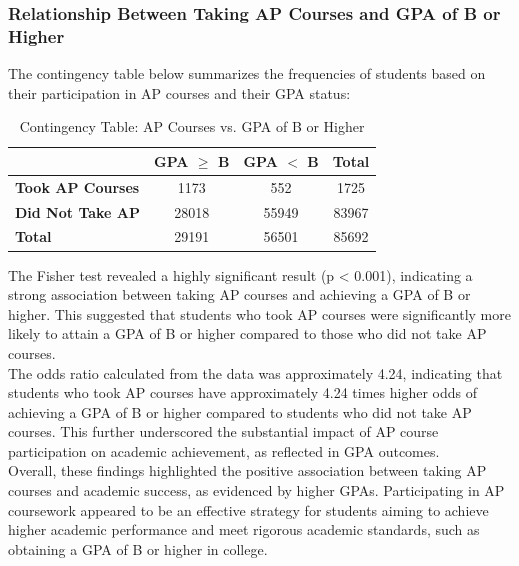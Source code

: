 \documentclass[sn-mathphys-num]{sn-jnl}%
\theoremstyle{thmstyleone}%
\theoremstyle{thmstyletwo}%
\theoremstyle{thmstylethree}%
\begin{document}
{%

\subsubsection{Relationship Between Taking AP Courses and GPA of B or Higher}
\label{sub:gpa}

The contingency table below summarizes the frequencies of students based on their participation in AP courses and their GPA status:\\

\begin{table}[htbp]
\centering
\caption{Contingency Table: AP Courses vs. GPA of B or Higher}
\begin{tabular}{|l|c|c|c|}
\hline
& \textbf{GPA $\geq$ B} & \textbf{GPA $<$ B} & \textbf{Total} \\ \hline
\textbf{Took AP Courses} & 1173 & 552 & 1725 \\ \hline
\textbf{Did Not Take AP} & 28018 & 55949 & 83967 \\ \hline
\textbf{Total} & 29191 & 56501 & 85692 \\ \hline
\end{tabular}
\end{table}

The Fisher test revealed a highly significant result (p < 0.001), indicating a strong association between taking AP courses and achieving a GPA of B or higher. This suggested that students who took AP courses were significantly more likely to attain a GPA of B or higher compared to those who did not take AP courses.\\

The odds ratio calculated from the data was approximately 4.24, indicating that students who took AP courses have approximately 4.24 times higher odds of achieving a GPA of B or higher compared to students who did not take AP courses. This further underscored the substantial impact of AP course participation on academic achievement, as reflected in GPA outcomes.\\

Overall, these findings highlighted the positive association between taking AP courses and academic success, as evidenced by higher GPAs. Participating in AP coursework appeared to be an effective strategy for students aiming to achieve higher academic performance and meet rigorous academic standards, such as obtaining a GPA of B or higher in college.\\

}
\end{document}

